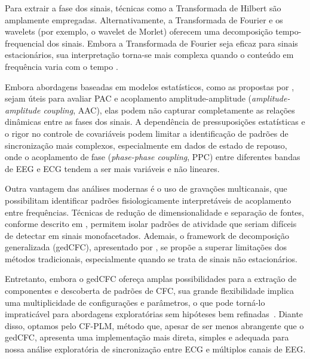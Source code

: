 Para extrair a fase dos sinais, técnicas como a Transformada de Hilbert são amplamente empregadas. Alternativamente, a Transformada de Fourier e os wavelets (por exemplo, o wavelet de Morlet) oferecem uma decomposição tempo-frequencial dos sinais. Embora a Transformada de Fourier seja eficaz para sinais estacionários, sua interpretação torna-se mais complexa quando o conteúdo em frequência varia com o tempo \cite{singh2024evaluating}.

Embora abordagens baseadas em modelos estatísticos, como as propostas por , sejam úteis para avaliar PAC e acoplamento amplitude-amplitude (\textit{amplitude-amplitude coupling}, AAC), elas podem não capturar completamente as relações dinâmicas entre as fases dos sinais. A dependência de pressuposições estatísticas e o rigor no controle de covariáveis podem limitar a identificação de padrões de sincronização mais complexos, especialmente em dados de estado de repouso, onde o acoplamento de fase (\textit{phase-phase coupling}, PPC) entre diferentes bandas de EEG e ECG tendem a ser mais variáveis e não lineares.

Outra vantagem das análises modernas é o uso de gravações multicanais, que possibilitam identificar padrões fisiologicamente interpretáveis de acoplamento entre frequências. Técnicas de redução de dimensionalidade e separação de fontes, conforme descrito em , permitem isolar padrões de atividade que seriam difíceis de detectar em sinais monofacetados. Ademais, o framework de decomposição generalizada (gedCFC), apresentado por , se propõe a superar limitações dos métodos tradicionais, especialmente quando se trata de sinais não estacionários.

Entretanto, embora o gedCFC ofereça amplas possibilidades para a extração de componentes e descoberta de padrões de CFC, sua grande flexibilidade implica uma multiplicidade de configurações e parâmetros, o que pode torná-lo impraticável para abordagens exploratórias sem hipóteses bem refinadas~\cite{cohen2017multivariate}. Diante disso, optamos pelo CF-PLM, método que, apesar de ser menos abrangente que o gedCFC, apresenta uma implementação mais direta, simples e adequada para nossa análise exploratória de sincronização entre ECG e múltiplos canais de EEG.

